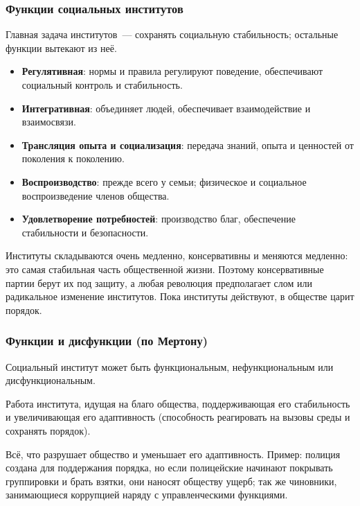 \documentclass[12pt]{article}
\begin{document}
	\subsubsection{Функции социальных институтов}

	Главная задача институтов~--- сохранять социальную стабильность; остальные функции вытекают из неё.

	\begin{itemize}
		\item \textbf{Регулятивная}: нормы и правила регулируют поведение, обеспечивают социальный контроль и стабильность.
		\item \textbf{Интегративная}: объединяет людей, обеспечивает взаимодействие и взаимосвязи.
		\item \textbf{Трансляция опыта и социализация}: передача знаний, опыта и ценностей от поколения к поколению.
		\item \textbf{Воспроизводство}: прежде всего у семьи; физическое и социальное воспроизведение членов общества.
		\item \textbf{Удовлетворение потребностей}: производство благ, обеспечение стабильности и безопасности.
	\end{itemize}

	\begin{note}
		Институты складываются очень медленно, консервативны и меняются медленно: это самая стабильная часть общественной жизни. Поэтому консервативные партии берут их под защиту, а любая революция предполагает слом или радикальное изменение институтов. Пока институты действуют, в обществе царит порядок.
	\end{note}

	\subsubsection{Функции и дисфункции (по Мертону)}

	\begin{person}
		Социальный институт может быть функциональным, нефункциональным или дисфункциональным.
	\end{person}

	\begin{definition}[Функция]
		Работа института, идущая на благо общества, поддерживающая его стабильность и увеличивающая его адаптивность (способность реагировать на вызовы среды и сохранять порядок).
	\end{definition}

	\begin{definition}[Дисфункция]
		Всё, что разрушает общество и уменьшает его адаптивность. Пример: полиция создана для поддержания порядка, но если полицейские начинают покрывать группировки и брать взятки, они наносят обществу ущерб; так же чиновники, занимающиеся коррупцией наряду с управленческими функциями.
	\end{definition}
\end{document}

